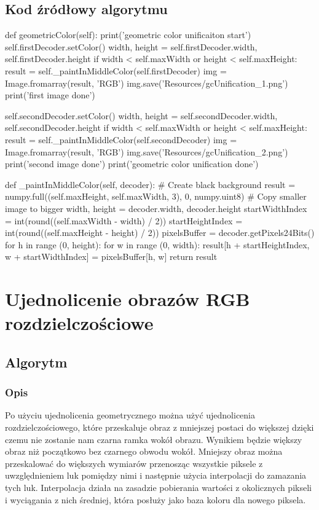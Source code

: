 \documentclass[a4paper,12pt]{book}
\begin{document}
\subsection*{Kod źródłowy algorytmu}
\begin{python}
def geometricColor(self):
	print('geometric color unificaiton start')
	self.firstDecoder.setColor()
	width, height = self.firstDecoder.width, self.firstDecoder.height
	if width < self.maxWidth or height < self.maxHeight:
		result = self._paintInMiddleColor(self.firstDecoder)
		img = Image.fromarray(result, 'RGB')
		img.save('Resources/gcUnification_1.png')
		print('first image done')
	
	self.secondDecoder.setColor()
	width, height = self.secondDecoder.width, self.secondDecoder.height
	if width < self.maxWidth or height < self.maxHeight:
		result = self._paintInMiddleColor(self.secondDecoder)
		img = Image.fromarray(result, 'RGB')
		img.save('Resources/gcUnification_2.png')
		print('second image done')
	print('geometric color unification done')
	
def _paintInMiddleColor(self, decoder):
	# Create black background
	result = numpy.full((self.maxHeight, self.maxWidth, 3), 0, numpy.uint8)
	# Copy smaller image to bigger
	width, height = decoder.width, decoder.height
	startWidthIndex = int(round((self.maxWidth - width) / 2))
	startHeightIndex = int(round((self.maxHeight - height) / 2))
	pixelsBuffer = decoder.getPixels24Bits()
	for h in range (0, height):
		for w in range (0, width):
			result[h + startHeightIndex, w + startWidthIndex] = pixelsBuffer[h, w]
	return result
\end{python}
\section{Ujednolicenie obrazów RGB rozdzielczościowe}
\subsection*{Algorytm}
\subsubsection*{Opis}
Po użyciu ujednolicenia geometrycznego można użyć ujednolicenia rozdzielczościowego, które przeskaluje obraz z mniejszej postaci do większej dzięki czemu nie zostanie nam czarna ramka wokół obrazu. Wynikiem będzie większy obraz niż początkowo bez czarnego obwodu wokół. 
Mniejszy obraz można przeskalować do większych wymiarów przenosząc wszystkie piksele z uwzględnieniem luk pomiędzy nimi i następnie użycia interpolacji do zamazania tych luk. 
Interpolacja działa na zasadzie pobierania wartości z okolicznych pikseli i wyciągania z nich średniej, która posłuży jako baza koloru dla nowego piksela. 
\end{document}
